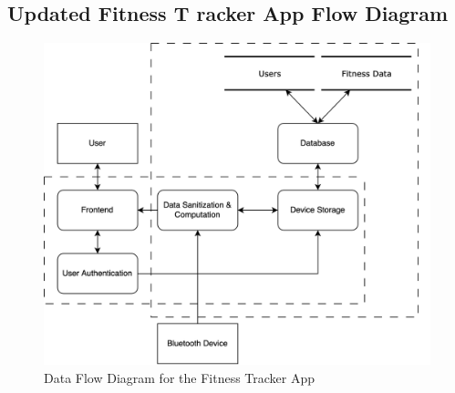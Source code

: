 \subsection{Updated Fitness T racker App Flow Diagram}
\begin{figure}[H]
  \caption{Data Flow Diagram for the Fitness Tracker App}
  \vspace*{1em}
  \begin{center}
    \includegraphics[width=\textwidth]{Diagrams/threat-modelling-2.png}
  \end{center}
\end{figure}
